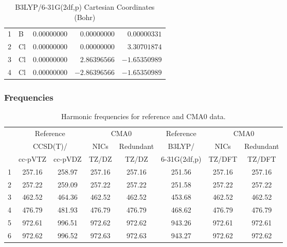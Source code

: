 \documentclass[10pt,oneside]{article}
\begin{document}
\begin{table}[h]
\centering
\caption{B3LYP/6-31G(2df,p) Cartesian Coordinates (Bohr)}
\begin{tabular}{llrrr}
\toprule
1  & B  & $ 0.00000000$ & $ 0.00000000$ & $ 0.00000331$ \\
2  & Cl & $ 0.00000000$ & $ 0.00000000$ & $ 3.30701874$ \\
3  & Cl & $ 0.00000000$ & $ 2.86396566$ & $-1.65350989$ \\
4  & Cl & $ 0.00000000$ & $-2.86396566$ & $-1.65350989$ \\
\bottomrule
\end{tabular}
\end{table}

\begin{table}[h!]
\subsubsection*{Frequencies}
\centering
\caption{Harmonic frequencies for reference and CMA0 data.}
\begin{tabular}{cccccccc}
\toprule
{} & \multicolumn{2}{c}{Reference} & \multicolumn{2}{c}{CMA0} &    Reference & \multicolumn{2}{c}{CMA0} \\
{} & \multicolumn{2}{c}{CCSD(T)/} &   NICs &  Redundant &       B3LYP/ &   NICs & Redundant \\
{} &   cc-pVTZ & cc-pVDZ &  TZ/DZ &      TZ/DZ & 6-31G(2df,p) & TZ/DFT &    TZ/DFT \\
\midrule
1 &    257.16 &  258.97 & 257.16 &     257.16 &       251.56 & 257.16 &    257.16 \\
2 &    257.22 &  259.09 & 257.22 &     257.22 &       251.58 & 257.22 &    257.22 \\
3 &    462.52 &  464.36 & 462.52 &     462.52 &       453.68 & 462.52 &    462.52 \\
4 &    476.79 &  481.93 & 476.79 &     476.79 &       468.62 & 476.79 &    476.79 \\
5 &    972.61 &  996.51 & 972.62 &     972.62 &       943.26 & 972.61 &    972.61 \\
6 &    972.62 &  996.52 & 972.63 &     972.63 &       943.27 & 972.62 &    972.62 \\
\bottomrule
\end{tabular}
\end{table}
\end{document}

